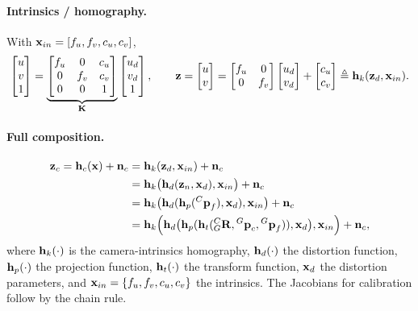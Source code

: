 \paragraph{Intrinsics / homography.} With $\boldsymbol{\mathbf{x}}_{in} = [f_u,f_v,c_u,c_v]$,
\begin{align}
\begin{bmatrix} u \\ v \\ 1 \end{bmatrix}
= \underbrace{\begin{bmatrix} f_u & 0 & c_u \\ 0 & f_v & c_v \\ 0 & 0 & 1 \end{bmatrix}}_{\boldsymbol{\mathbf{K}}}\begin{bmatrix} u_d \\ v_d \\ 1 \end{bmatrix}, \qquad
\boldsymbol{\mathbf{z}} = \begin{bmatrix} u \\ v \end{bmatrix} = \begin{bmatrix} f_u & 0 \\ 0 & f_v \end{bmatrix}\begin{bmatrix} u_d \\ v_d \end{bmatrix} + \begin{bmatrix} c_u \\ c_v \end{bmatrix} \triangleq \boldsymbol{\mathbf{h}}_k(\boldsymbol{\mathbf{z}}_d,\boldsymbol{\mathbf{x}}_{in}).
\end{align}
\paragraph{Full composition.}
\begin{align}
\boldsymbol{\mathbf{z}}_c = \boldsymbol{\mathbf{h}}_c(\boldsymbol{\mathbf{x}}) + \boldsymbol{\mathbf{n}}_c
&= \boldsymbol{\mathbf{h}}_k(\boldsymbol{\mathbf{z}}_d,\boldsymbol{\mathbf{x}}_{in}) + \boldsymbol{\mathbf{n}}_c \\
&= \boldsymbol{\mathbf{h}}_k\big(\boldsymbol{\mathbf{h}}_d(\boldsymbol{\mathbf{z}}_n,\boldsymbol{\mathbf{x}}_d),\boldsymbol{\mathbf{x}}_{in}\big) + \boldsymbol{\mathbf{n}}_c \\
&= \boldsymbol{\mathbf{h}}_k\big(\boldsymbol{\mathbf{h}}_d(\boldsymbol{\mathbf{h}}_p({}^{C}\boldsymbol{\mathbf{p}}_f),\boldsymbol{\mathbf{x}}_d),\boldsymbol{\mathbf{x}}_{in}\big) + \boldsymbol{\mathbf{n}}_c \\
&= \boldsymbol{\mathbf{h}}_k\Big(\boldsymbol{\mathbf{h}}_d\big(\boldsymbol{\mathbf{h}}_p(\boldsymbol{\mathbf{h}}_t({}^{C}_{G}\boldsymbol{\mathbf{R}},{}^{G}\boldsymbol{\mathbf{p}}_c,{}^{G}\boldsymbol{\mathbf{p}}_f)),\boldsymbol{\mathbf{x}}_d\big),\boldsymbol{\mathbf{x}}_{in}\Big) + \boldsymbol{\mathbf{n}}_c,
\end{align}
where $\boldsymbol{\mathbf{h}}_k(\cdot)$ is the camera-intrinsics homography, $\boldsymbol{\mathbf{h}}_d(\cdot)$ the distortion function, $\boldsymbol{\mathbf{h}}_p(\cdot)$ the projection function, $\boldsymbol{\mathbf{h}}_t(\cdot)$ the transform function, $\boldsymbol{\mathbf{x}}_d$ the distortion parameters, and $\boldsymbol{\mathbf{x}}_{in}=\{f_u,f_v,c_u,c_v\}$ the intrinsics. The Jacobians for calibration follow by the chain rule.

